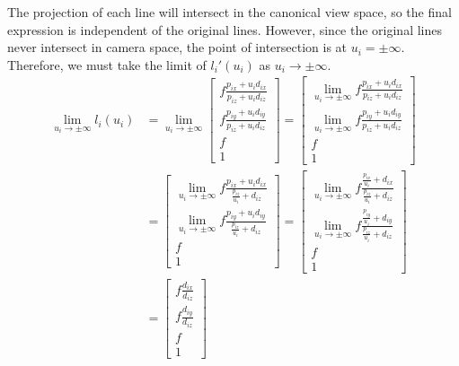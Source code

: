 \documentclass{article} %
\begin{document}
The projection of each line will intersect in the canonical view space, so the final expression is independent of the original lines. However, since the original lines never intersect in camera space, the point of intersection is at $u_i = \pm\infty$. Therefore, we must take the limit of $l_i'(u_i)$ as $u_i \to \pm \infty$.
\begin{align*}
\lim_{u_i \to \pm \infty} l_i(u_i) &=
\lim_{u_i \to \pm \infty}  \begin{bmatrix}
f\frac{p_{ix} + u_i d_{ix}}{p_{iz} + u_i d_{iz}}\\
f\frac{p_{iy} + u_i d_{iy}}{p_{iz} + u_i d_{iz}}\\
f\\
1
\end{bmatrix}
= \begin{bmatrix}
\lim_{u_i \to \pm \infty} f\frac{p_{ix} + u_i d_{ix}}{p_{iz} + u_i d_{iz}}\\
\lim_{u_i \to \pm \infty} f\frac{p_{iy} + u_i d_{iy}}{p_{iz} + u_i d_{iz}}\\
f\\
1
\end{bmatrix}\\
&= \begin{bmatrix}
\lim_{u_i \to \pm \infty} f\frac{p_{ix} + u_i d_{ix}}{\frac{p_{iz}}{u_i} + d_{iz}}\\
\lim_{u_i \to \pm \infty} f\frac{p_{iy} + u_i d_{iy}}{\frac{p_{iz}}{u_i} + d_{iz}}\\
f\\
1
\end{bmatrix}
= \begin{bmatrix}
\lim_{u_i \to \pm \infty} f\frac{\frac{p_{ix}}{u_i} + d_{ix}}{\frac{p_{iz}}{u_i} + d_{iz}}\\
\lim_{u_i \to \pm \infty} f\frac{\frac{p_{iy}}{u_i} + d_{iy}}{\frac{p_{iz}}{u_i} + d_{iz}}\\
f\\
1
\end{bmatrix}\\
&= \begin{bmatrix}
f\frac{d_{ix}}{d_{iz}}\\
f\frac{d_{iy}}{d_{iz}}\\
f\\
1
\end{bmatrix}
\end{align*}

\end{document}
